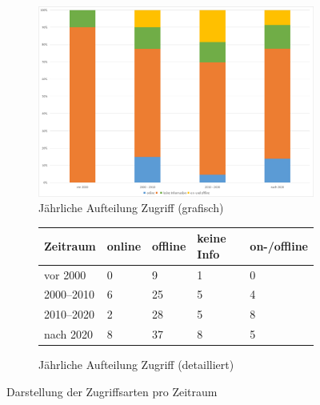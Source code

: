 \begin{figure}[!htbp]
    \centering
    \begin{subfigure}[b]{0.48\textwidth}
        \centering
        \includegraphics[width=\textwidth]{graphics/12-zugriff-jahr.png}
        \caption{Jährliche Aufteilung Zugriff (grafisch)}
        \label{fig:12-zugriff-jahr}
    \end{subfigure}
    \hfill
    \begin{subfigure}[b]{0.48\textwidth}
        \centering
        \tiny
        \begin{tabularx}{\textwidth}{lXXXX}
            \hline
            \textbf{Zeitraum} & \textbf{online} & \textbf{offline} & \textbf{keine Info} & \textbf{on-/offline} \\
            \hline
            vor 2000      & 0  & 9  & 1 & 0 \\
            2000--2010    & 6  & 25 & 5 & 4 \\
            2010--2020    & 2  & 28 & 5 & 8 \\
            nach 2020     & 8  & 37 & 8 & 5 \\
            \hline
        \end{tabularx}
        \caption{Jährliche Aufteilung Zugriff (detailliert)}
        \label{tab:zugriff-zeit}
    \end{subfigure}
    \caption{Darstellung der Zugriffsarten pro Zeitraum}
    \label{fig:zugriff-gesamt}
\end{figure}

